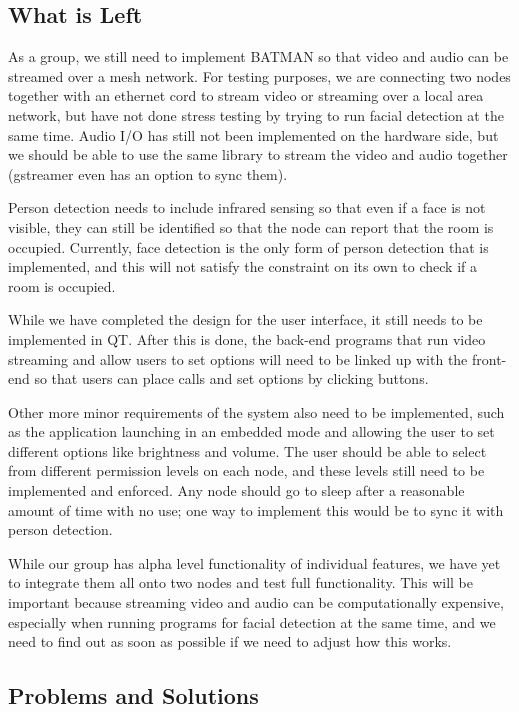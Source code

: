 \documentclass[onecolumn, draftclsnofoot,10pt, compsoc]{IEEEtran}
\begin{document}
\subsection{What is Left}

As a group, we still need to implement BATMAN so that video and audio can be streamed over a mesh network. For testing purposes, we are connecting two nodes together with an ethernet cord to stream video or streaming over a local area network, but have not done stress testing by trying to run facial detection at the same time. Audio I/O has still not been implemented on the hardware side, but we should be able to use the same library to stream the video and audio together (gstreamer even has an option to sync them). 

Person detection needs to include infrared sensing so that even if a face is not visible, they can still be identified so that the node can report that the room is occupied. Currently, face detection is the only form of person detection that is implemented, and this will not satisfy the constraint on its own to check if a room is occupied. 

While we have completed the design for the user interface, it still needs to be implemented in QT. After this is done, the back-end programs that run video streaming and allow users to set options will need to be linked up with the front-end so that users can place calls and set options by clicking buttons. 

Other more minor requirements of the system also need to be implemented, such as the application launching in an embedded mode and allowing the user to set different options like brightness and volume. The user should be able to select from different permission levels on each node, and these levels still need to be implemented and enforced. Any node should go to sleep after a reasonable amount of time with no use; one way to implement this would be to sync it with person detection. 

While our group has alpha level functionality of individual features, we have yet to integrate them all onto two nodes and test full functionality. This will be important because streaming video and audio can be computationally expensive, especially when running programs for facial detection at the same time, and we need to find out as soon as possible if we need to adjust how this works.  

\subsection{Problems and Solutions}
\end{document}
